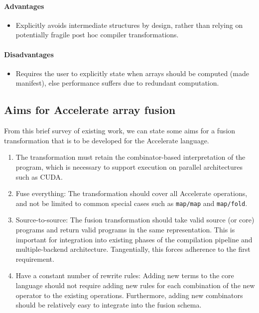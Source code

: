\paragraph{Advantages}
\begin{itemize}
    \item Explicitly avoids intermediate structures by design, rather than
        relying on potentially fragile post hoc compiler transformations.
\end{itemize}

\paragraph{Disadvantages}
\begin{itemize}
    \item Requires the user to explicitly state when arrays should be computed
        (made manifest), else performance suffers due to redundant computation.
\end{itemize}


\subsection{Aims for Accelerate array fusion}

From this brief survey of existing work, we can state some aims for a fusion
transformation that is to be developed for the Accelerate language.

\begin{enumerate}
    \item The transformation must retain the combinator-based interpretation of
        the program, which is necessary to support execution on parallel
        architectures such as CUDA.

    \item Fuse everything: The transformation should cover all Accelerate
        operations, and not be limited to common special cases such as
        \texttt{map/map} and \texttt{map/fold}.

    \item Source-to-source: The fusion transformation should take valid source
        (or core) programs and return valid programs in the same representation.
        This is important for integration into existing phases of the compilation
        pipeline and multiple-backend architecture. Tangentially, this forces
        adherence to the first requirement.

    \item Have a constant number of rewrite rules: Adding new terms to the core
        language should not require adding new rules for each combination of the
        new operator to the existing operations. Furthermore, adding new
        combinators should be relatively easy to integrate into the fusion
        schema.
\end{enumerate}

